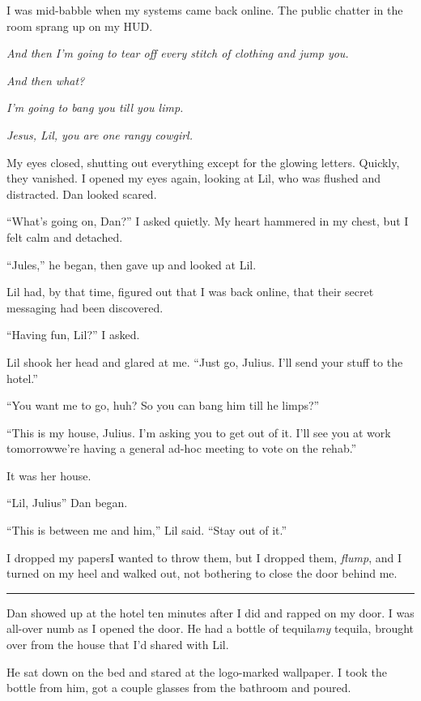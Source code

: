 I was mid-babble when my systems came back online. The public
chatter in the room sprang up on my HUD.

\emph{And then I'm going to tear off every stitch of clothing and jump you.}

\emph{And then what?}

\emph{I'm going to bang you till you limp.}

\emph{Jesus, Lil, you are one rangy cowgirl.}

My eyes closed, shutting out everything except for the glowing
letters. Quickly, they vanished. I opened my eyes again, looking at
Lil, who was flushed and distracted. Dan looked scared.

“What's going on, Dan?” I asked quietly. My heart hammered in my
chest, but I felt calm and detached.

“Jules,” he began, then gave up and looked at Lil.

Lil had, by that time, figured out that I was back online, that
their secret messaging had been discovered.

“Having fun, Lil?” I asked.

Lil shook her head and glared at me. “Just go, Julius. I'll send
your stuff to the hotel.”

“You want me to go, huh? So you can bang him till he limps?”

“This is my house, Julius. I'm asking you to get out of it. I'll
see you at work tomorrow{\dash}we're having a general ad-hoc meeting to
vote on the rehab.”

It was her house.

“Lil, Julius{\dash}” Dan began.

“This is between me and him,” Lil said. “Stay out of it.”

I dropped my papers{\dash}I wanted to throw them, but I dropped them,
\emph{flump}, and I turned on my heel and walked out, not bothering
to close the door behind me.

\begin{center}\rule{3in}{0.4pt}\end{center}

Dan showed up at the hotel ten minutes after I did and rapped on my
door. I was all-over numb as I opened the door. He had a bottle of
tequila{\dash}\emph{my} tequila, brought over from the house that I'd
shared with Lil.

He sat down on the bed and stared at the logo-marked wallpaper. I
took the bottle from him, got a couple glasses from the bathroom
and poured.

